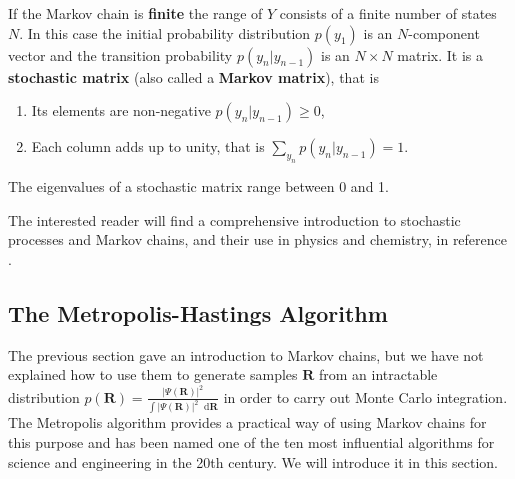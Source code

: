 \documentclass[twoside,english]{uiofysmaster}
\newcommand*\dif{\mathop{}\!\mathrm{d}}
\begin{document}
If the Markov chain is \textbf{finite} the range of $Y$ consists of a finite number of states $N$. In this case the initial probability distribution $p (y_1)$ is an $N$-component vector and the transition probability $p (y_n | y_{n-1})$ is an $N\times N$ matrix.
It is a \textbf{stochastic matrix} (also called a \textbf{Markov matrix}), that is
\begin{mdframed}[hidealllines=true,backgroundcolor=blue!20]
\begin{enumerate}
	\item Its elements are non-negative $p (y_n | y_{n-1}) \geq 0$,
	\item Each column adds up to unity, that is $\sum_{y_n} p (y_n | y_{n-1}) =1 $.
\end{enumerate}
\end{mdframed}
The eigenvalues of a stochastic matrix range between 0 and 1.


\begin{comment}
$T$ has a right eigenvector $p^s$ with eigenvalue 1 such that $T p^s = p^s$, which is the $P_1(y)$ of the stochastic process. $p^s$ represents a steady state or stationary probabilitiy distribution which the Markov chain reaches asymptotically. That is, it can be shown (except for a few exeptional cases) \cite{VanKampen2007} that for any initial $p(0)$
\begin{align}
	\text{lim}_{t\rightarrow \infty} p(t) = \text{lim}_{t\rightarrow \infty} T^t p(0) = p^s .
\end{align}
The goal of MCMC methods is to approximate the desired sampling distribution with the stationary distribution reached by a Markov chain.
\end{comment}



The interested reader will find a comprehensive introduction to stochastic processes and Markov chains, and their use in physics and chemistry, in reference \cite{VanKampen2007}. 





\subsection{The Metropolis-Hastings Algorithm}
\label{sec:MetroHastings}
The previous section gave an introduction to Markov chains, but we have not explained how to use them to generate samples $\bm{R}$ from an intractable distribution $p(\bm{R}) = \frac{| \Psi(\bm{R})|^2 }{ \int | \Psi(\bm{R})|^2 \dif \bm{R} }$ in order to carry out Monte Carlo integration. 
The Metropolis algorithm provides a practical way of using Markov chains for this purpose and has been named one of the ten most influential algorithms for science and engineering in the 20th century. We will introduce it in this section.
\end{document}
